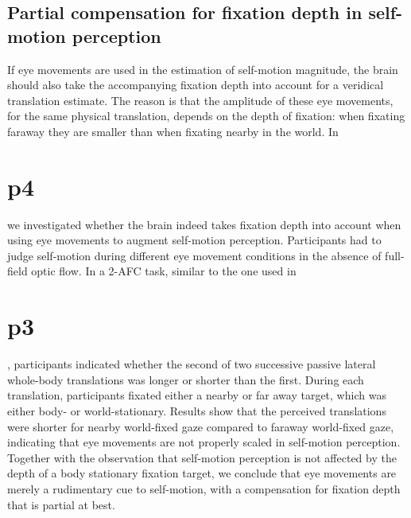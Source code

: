 \section{Partial compensation for fixation depth in self-motion perception}
If eye movements are used in the estimation of self-motion magnitude, the brain should also take the accompanying fixation depth into account for a veridical translation estimate. The reason is that the amplitude of these eye movements, for the same physical translation, depends on the depth of fixation: when fixating faraway they are smaller than when fixating nearby in the world.  In \chapter{p4} we investigated whether the brain indeed takes fixation depth into account when using eye movements to augment self-motion perception. Participants had to judge self-motion during different eye movement conditions in the absence of full-field optic flow. In a 2-AFC task, similar to the one used in \chapter{p3}, participants indicated whether the second of two successive passive lateral whole-body translations was longer or shorter than the first. During each translation, participants fixated either a nearby or far away target, which was either body- or world-stationary. Results show that the perceived translations were shorter for nearby world-fixed gaze compared to faraway world-fixed gaze, indicating that eye movements are not properly scaled in self-motion perception. Together with the observation that self-motion perception is not affected by the depth of a body stationary fixation target, we conclude that eye movements are merely a rudimentary cue to self-motion, with a compensation for fixation depth that is partial at best.

